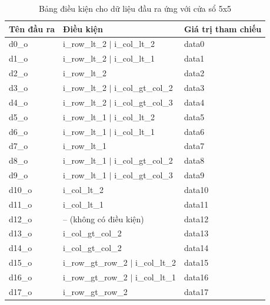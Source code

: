 \begin{table}[!ht]
    \centering
    \renewcommand{\arraystretch}{1.4}
        \caption{Bảng điều kiện cho dữ liệu đầu ra ứng với cửa sổ 5x5}
    \begin{tabular}{|p{2.2cm} p{7cm} p{4cm}|}
        \hline
        \rowcolor{gray!30}
        \textbf{Tên đầu ra} & \textbf{Điều kiện} & \textbf{Giá trị tham chiếu} \\
        \hline
        d0\_o  & i\_row\_lt\_2 $\vert$ i\_col\_lt\_2         & data0  \\ \hline
        d1\_o  & i\_row\_lt\_2 $\vert$ i\_col\_lt\_1         & data1  \\ \hline
        d2\_o  & i\_row\_lt\_2                                & data2  \\ \hline
        d3\_o  & i\_row\_lt\_2 $\vert$ i\_col\_gt\_col\_2     & data3  \\ \hline
        d4\_o  & i\_row\_lt\_2 $\vert$ i\_col\_gt\_col\_3     & data4  \\ \hline
        d5\_o  & i\_row\_lt\_1 $\vert$ i\_col\_lt\_2         & data5  \\ \hline
        d6\_o  & i\_row\_lt\_1 $\vert$ i\_col\_lt\_1         & data6  \\ \hline
        d7\_o  & i\_row\_lt\_1                                & data7  \\ \hline
        d8\_o  & i\_row\_lt\_1 $\vert$ i\_col\_gt\_col\_2     & data8  \\ \hline
        d9\_o  & i\_row\_lt\_1 $\vert$ i\_col\_gt\_col\_3     & data9  \\ \hline
        d10\_o & i\_col\_lt\_2                                & data10 \\ \hline
        d11\_o & i\_col\_lt\_1                                & data11 \\ \hline
        d12\_o & -- (không có điều kiện)                     & data12 \\ \hline
        d13\_o & i\_col\_gt\_col\_2                           & data13 \\ \hline
        d14\_o & i\_col\_gt\_col\_2                           & data14 \\ \hline
      d15\_o & i\_row\_gt\_row\_2 $\vert$ i\_col\_lt\_2     & data15 \\ \hline
      d16\_o & i\_row\_gt\_row\_2 $\vert$ i\_col\_lt\_1     & data16 \\ \hline
      d17\_o & i\_row\_gt\_row\_2                           & data17 \\ \hline

\end{tabular}
\end{table}
